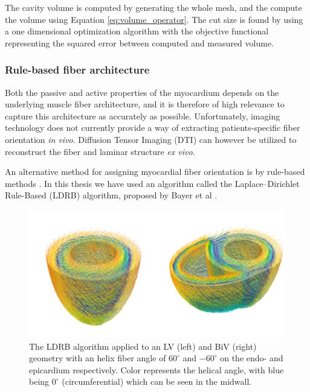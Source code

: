 \begin{remark}
  The cavity volume is computed by generating the whole mesh, and the
  compute the volume using Equation \eqref{eq:volume_operator}. The cut size is
  found by using a one dimensional optimization algorithm with
  the objective functional representing the squared error between
  computed and measured volume.
\end{remark}




\subsubsection{Rule-based fiber architecture}
\label{sec:rule_based_fiber}
Both the passive and active properties of the myocardium depends on
the underlying muscle fiber architecture, and it is therefore of high
relevance to capture this architecture as accurately as
possible. Unfortunately, imaging technology does not currently provide a
way of extracting patients-specific fiber orientation \emph{in
  vivo}. Diffusion Tensor Imaging (DTI) can however be utilized to reconstruct
the fiber and laminar structure \emph{ex vivo}\cite{rohmer2007reconstruction}.

An alternative method for assigning myocardial fiber orientation is by
rule-based methods \cite{potse2006comparison, bayer2012novel}. 
In this thesis we have used an algorithm called the Laplace–Dirichlet
Rule-Based (LDRB) algorithm, proposed by Bayer et al \cite{bayer2012novel}.


\begin{figure}[htbp]
  \centering
  \includegraphics[width=\textwidth]
  {chapters/introduction/figures/fiber/fiber}
\caption{The LDRB algorithm \cite{bayer2012novel} applied to an LV
  (left) and BiV (right) geometry with an helix fiber angle of
  $60^{\circ}$ and $-60^{\circ}$ on the endo- and epicardium
  respectively. Color represents the helical angle, with blue being
  $0^{\circ}$ (circumferential) which can be seen in the midwall. }
\label{fig:rule_based_fiber}
\end{figure}


